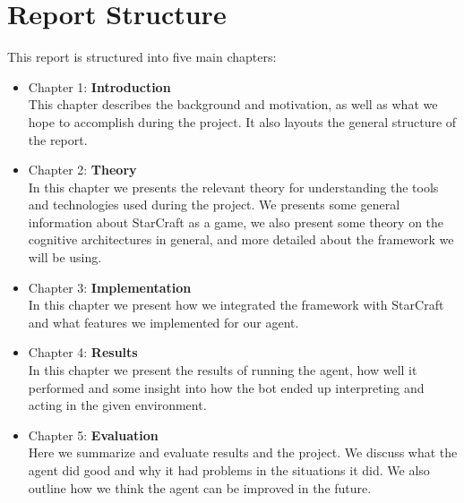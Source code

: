 \section{Report Structure}
\label{sec:structure}
This report is structured into five main chapters:
\begin{itemize}
\item Chapter 1: \textbf{Introduction} \\
This chapter describes the background and motivation, as well as what we hope to accomplish during the project. It also layouts the general structure of the report.
\item Chapter 2: \textbf{Theory} \\
In this chapter we presents the relevant theory for understanding the tools and technologies used during the project. We presents some general information about StarCraft as a game, we also present some theory on the cognitive architectures in general, and more detailed about the framework we will be using.
\item Chapter 3: \textbf{Implementation} \\
In this chapter we present how we integrated the framework with StarCraft and what features we implemented for our agent.
\item Chapter 4: \textbf{Results} \\
In this chapter we present the results of running the agent, how well it performed and some insight into how the bot ended up interpreting and acting in the given environment.
\item Chapter 5: \textbf{Evaluation} \\
Here we summarize and evaluate results and the project. We discuss what the agent did good and why it had problems in the situations it did. We also outline how we think the agent can be improved in the future.

\end{itemize}
